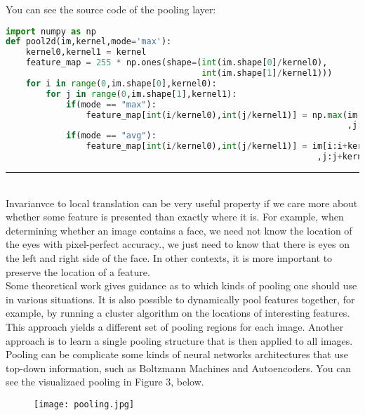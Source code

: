 \documentclass[11pt]{article}
\begin{document}
You can see the source code of the pooling layer:\\
\begin{lstlisting}[language=Python,basicstyle=\tiny]
import numpy as np
def pool2d(im,kernel,mode='max'):
    kernel0,kernel1 = kernel
    feature_map = 255 * np.ones(shape=(int(im.shape[0]/kernel0),
                                       int(im.shape[1]/kernel1)))
    for i in range(0,im.shape[0],kernel0):
        for j in range(0,im.shape[1],kernel1):
            if(mode == "max"):
                feature_map[int(i/kernel0),int(j/kernel1)] = np.max(im[i:i+kernel0
                                                                    ,j:j+kernel1])
            if(mode == "avg"):
                feature_map[int(i/kernel0),int(j/kernel1)] = im[i:i+kernel0
                                                              ,j:j+kernel1].mean()
\end{lstlisting}
\par\noindent\rule{\textwidth}{0.5pt}\\
Invarianvce to local translation can be very useful property if we care more about whether some feature is presented than exactly where it is. For example, when determining whether an image contains a face, we need not know the location of the eyes with pixel-perfect accuracy., we just need to know that there is eyes on the left and right side of the face. In other contexts, it is more important to preserve the location of a feature. \\
Some theoretical work gives guidance as to which kinds of pooling one should use in various situations. It is also possible to dynamically pool features together, for example, by running a cluster algorithm on the locations of interesting features. This approach yields a different set of pooling regions for each image. Another approach is to learn a single pooling structure that is then applied to all images.\\
Pooling can be complicate some kinds of neural networks architectures that use top-down information, such as Boltzmann Machines and Autoencoders. You can see the visualizaed pooling in Figure 3, below. 
\begin{figure}[H]

\centering
\texttt{[image: pooling.jpg]}
\caption{}
\label{fig:figure3}
\end{figure}
\end{document}
